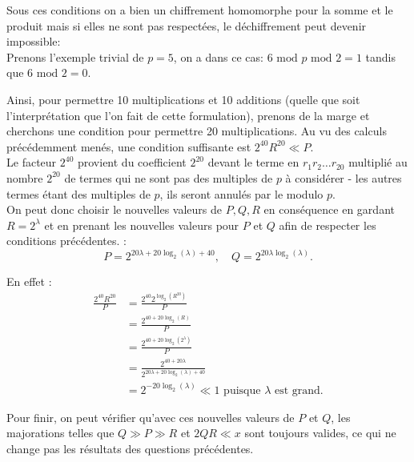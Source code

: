 \documentclass{article}
\begin{document}
Sous ces conditions on a bien un chiffrement homomorphe pour la somme et le produit mais si elles ne sont pas respectées, le déchiffrement peut devenir impossible:\\
Prenons l'exemple trivial de $p= 5$, on a dans ce cas: $6\textrm{ mod }p  \textrm{ mod } 2= 1$ tandis que $6\textrm{ mod } 2=0$. \\%
\par Ainsi, pour permettre 10 multiplications et 10 additions (quelle que soit l'interprétation que l'on fait de cette formulation), prenons de la marge et cherchons une condition pour permettre 20 multiplications. Au vu des calculs précédemment menés, une condition suffisante est $2^{40}R^{20} \ll P$. \\
Le facteur $2^{40}$ provient du coefficient $2^{20}$ devant le terme en $r_1r_2\dots r_{20}$ multiplié au nombre $2^{20}$ de termes qui ne sont pas des multiples de $p$ à considérer - les autres termes étant des multiples de $p$, ils seront annulés par le modulo $p$.\\
On peut donc choisir le nouvelles valeurs de $P,Q, R$ en conséquence en gardant $R=2^\lambda$ et en prenant les nouvelles valeurs pour $P$ et $Q$ afin de respecter les conditions précédentes. : \[P=2^{20\lambda+20 \log_2(\lambda)+40}, \quad Q=2^{20\lambda\log_2(\lambda)}.\]
\par En effet :
\begin{align*}
    \frac{2^{40}R^{20}}{P} &= \frac{2^{40}2^{\log_2(R^{20})}}{P} \\
    &= \frac{2^{40+20\log_2(R)}}{P} \\
    &= \frac{2^{40+20\log_2(2^\lambda)}}{P} \\
    &= \frac{2^{40+20\lambda}}{2^{20\lambda+20\log_2(\lambda)+40}} \\
    &= 2^{-20\log_2(\lambda)} \ll 1 \textrm{ puisque } \lambda \textrm{ est grand.}
\end{align*}

Pour finir, on peut vérifier qu'avec ces nouvelles valeurs de $P$ et $Q$, les majorations telles que $Q\gg P \gg R$ et $2QR \ll x$ sont toujours valides, ce qui ne change pas les résultats des questions précédentes.
\end{document}
